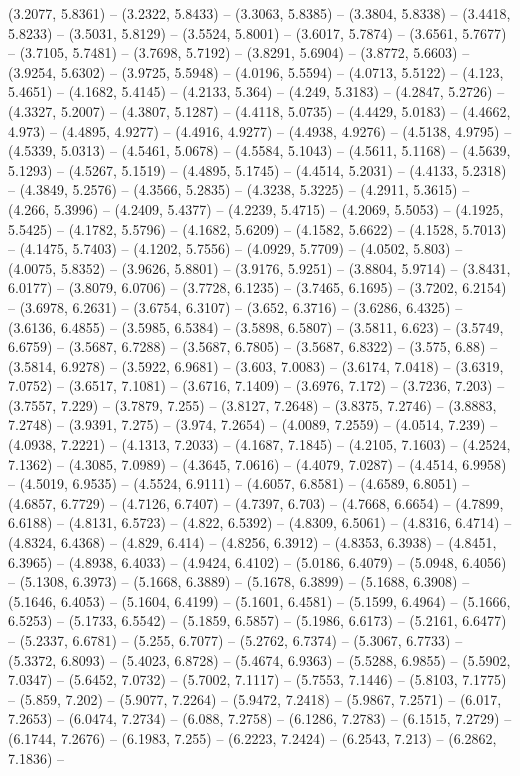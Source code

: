 (3.2077, 5.8361) -- (3.2322, 5.8433) -- (3.3063, 5.8385) -- (3.3804, 5.8338) -- (3.4418, 5.8233) -- (3.5031, 5.8129) -- (3.5524, 5.8001) -- (3.6017, 5.7874) -- (3.6561, 5.7677) -- (3.7105, 5.7481) -- (3.7698, 5.7192) -- (3.8291, 5.6904) -- (3.8772, 5.6603) -- (3.9254, 5.6302) -- (3.9725, 5.5948) -- (4.0196, 5.5594) -- (4.0713, 5.5122) -- (4.123, 5.4651) -- (4.1682, 5.4145) -- (4.2133, 5.364) -- (4.249, 5.3183) -- (4.2847, 5.2726) -- (4.3327, 5.2007) -- (4.3807, 5.1287) -- (4.4118, 5.0735) -- (4.4429, 5.0183) -- (4.4662, 4.973) -- (4.4895, 4.9277) -- (4.4916, 4.9277) -- (4.4938, 4.9276) -- (4.5138, 4.9795) -- (4.5339, 5.0313) -- (4.5461, 5.0678) -- (4.5584, 5.1043) -- (4.5611, 5.1168) -- (4.5639, 5.1293) -- (4.5267, 5.1519) -- (4.4895, 5.1745) -- (4.4514, 5.2031) -- (4.4133, 5.2318) -- (4.3849, 5.2576) -- (4.3566, 5.2835) -- (4.3238, 5.3225) -- (4.2911, 5.3615) -- (4.266, 5.3996) -- (4.2409, 5.4377) -- (4.2239, 5.4715) -- (4.2069, 5.5053) -- (4.1925, 5.5425) -- (4.1782, 5.5796) -- (4.1682, 5.6209) -- (4.1582, 5.6622) -- (4.1528, 5.7013) -- (4.1475, 5.7403) -- (4.1202, 5.7556) -- (4.0929, 5.7709) -- (4.0502, 5.803) -- (4.0075, 5.8352) -- (3.9626, 5.8801) -- (3.9176, 5.9251) -- (3.8804, 5.9714) -- (3.8431, 6.0177) -- (3.8079, 6.0706) -- (3.7728, 6.1235) -- (3.7465, 6.1695) -- (3.7202, 6.2154) -- (3.6978, 6.2631) -- (3.6754, 6.3107) -- (3.652, 6.3716) -- (3.6286, 6.4325) -- (3.6136, 6.4855) -- (3.5985, 6.5384) -- (3.5898, 6.5807) -- (3.5811, 6.623) -- (3.5749, 6.6759) -- (3.5687, 6.7288) -- (3.5687, 6.7805) -- (3.5687, 6.8322) -- (3.575, 6.88) -- (3.5814, 6.9278) -- (3.5922, 6.9681) -- (3.603, 7.0083) -- (3.6174, 7.0418) -- (3.6319, 7.0752) -- (3.6517, 7.1081) -- (3.6716, 7.1409) -- (3.6976, 7.172) -- (3.7236, 7.203) -- (3.7557, 7.229) -- (3.7879, 7.255) -- (3.8127, 7.2648) -- (3.8375, 7.2746) -- (3.8883, 7.2748) -- (3.9391, 7.275) -- (3.974, 7.2654) -- (4.0089, 7.2559) -- (4.0514, 7.239) -- (4.0938, 7.2221) -- (4.1313, 7.2033) -- (4.1687, 7.1845) -- (4.2105, 7.1603) -- (4.2524, 7.1362) -- (4.3085, 7.0989) -- (4.3645, 7.0616) -- (4.4079, 7.0287) -- (4.4514, 6.9958) -- (4.5019, 6.9535) -- (4.5524, 6.9111) -- (4.6057, 6.8581) -- (4.6589, 6.8051) -- (4.6857, 6.7729) -- (4.7126, 6.7407) -- (4.7397, 6.703) -- (4.7668, 6.6654) -- (4.7899, 6.6188) -- (4.8131, 6.5723) -- (4.822, 6.5392) -- (4.8309, 6.5061) -- (4.8316, 6.4714) -- (4.8324, 6.4368) -- (4.829, 6.414) -- (4.8256, 6.3912) -- (4.8353, 6.3938) -- (4.8451, 6.3965) -- (4.8938, 6.4033) -- (4.9424, 6.4102) -- (5.0186, 6.4079) -- (5.0948, 6.4056) -- (5.1308, 6.3973) -- (5.1668, 6.3889) -- (5.1678, 6.3899) -- (5.1688, 6.3908) -- (5.1646, 6.4053) -- (5.1604, 6.4199) -- (5.1601, 6.4581) -- (5.1599, 6.4964) -- (5.1666, 6.5253) -- (5.1733, 6.5542) -- (5.1859, 6.5857) -- (5.1986, 6.6173) -- (5.2161, 6.6477) -- (5.2337, 6.6781) -- (5.255, 6.7077) -- (5.2762, 6.7374) -- (5.3067, 6.7733) -- (5.3372, 6.8093) -- (5.4023, 6.8728) -- (5.4674, 6.9363) -- (5.5288, 6.9855) -- (5.5902, 7.0347) -- (5.6452, 7.0732) -- (5.7002, 7.1117) -- (5.7553, 7.1446) -- (5.8103, 7.1775) -- (5.859, 7.202) -- (5.9077, 7.2264) -- (5.9472, 7.2418) -- (5.9867, 7.2571) -- (6.017, 7.2653) -- (6.0474, 7.2734) -- (6.088, 7.2758) -- (6.1286, 7.2783) -- (6.1515, 7.2729) -- (6.1744, 7.2676) -- (6.1983, 7.255) -- (6.2223, 7.2424) -- (6.2543, 7.213) -- (6.2862, 7.1836) -- 